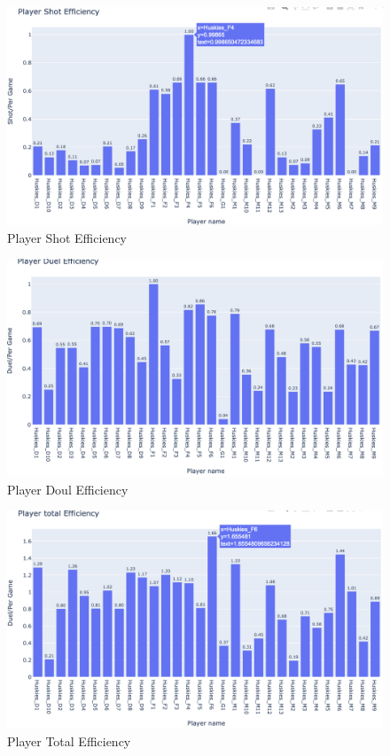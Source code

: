 \documentclass[12pt]{article}
\begin{document}
\begin{figure}[ht]
\begin{center}
\includegraphics[scale=0.5]{images/d.png}
\caption{Player Shot Efficiency}
\end{center}
\end{figure}
\begin{figure}[ht]
\begin{center}
\includegraphics[scale=0.5]{images/e.png}
\caption{Player Doul Efficiency}
\end{center}
\end{figure}
\begin{figure}[ht]
\begin{center}
\includegraphics[scale=0.5]{images/f.png}
\caption{Player Total Efficiency}
\end{center}
\end{figure}
\end{document}

